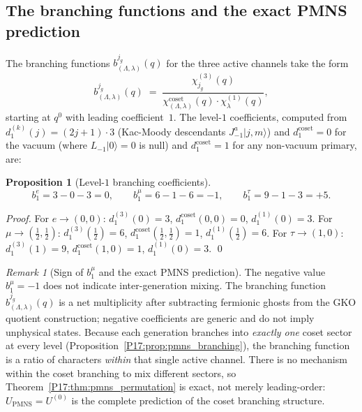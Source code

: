 \documentclass[11pt,a4paper]{article}
\newtheorem{proposition}[theorem]{Proposition}
\theoremstyle{definition}\newtheorem{definition}[theorem]{Definition}
\theoremstyle{remark}
\newtheorem{remark}[theorem]{Remark}
\begin{document}
\subsection{The branching functions and the exact PMNS prediction}

The branching functions $b^{j_g}_{(\Lambda,\lambda)}(q)$ for the three
active channels take the form
\[
  b^{j_g}_{(\Lambda,\lambda)}(q)
  \;=\;
  \frac{\chi_{j_g}^{(3)}(q)}
       {\chi^{\mathrm{coset}}_{(\Lambda,\lambda)}(q)\cdot\chi^{(1)}_\lambda(q)},
\]
starting at $q^0$ with leading coefficient~$1$.
The level-$1$ coefficients, computed from
$d_1^{(k)}(j)=(2j+1)\cdot3$ (Kac-Moody descendants $J^a_{-1}|j,m\rangle$)
and $d_1^{\mathrm{coset}}=0$ for the vacuum (where $L_{-1}|0\rangle=0$
is null) and $d_1^{\mathrm{coset}}=1$ for any non-vacuum primary, are:

\begin{proposition}[Level-$1$ branching coefficients]
\label{P17:prop:pmns_b1}
\begin{equation}
  b_1^e = 3-0-3 = 0,
  \qquad
  b_1^\mu = 6-1-6 = -1,
  \qquad
  b_1^\tau = 9-1-3 = +5.
  \label{P17:eq:b1_values}
\end{equation}
\end{proposition}

\begin{proof}
For $e\to(0,0)$: $d_1^{(3)}(0)=3$, $d_1^{\mathrm{coset}}(0,0)=0$, $d_1^{(1)}(0)=3$.
For $\mu\to(\tfrac12,\tfrac12)$: $d_1^{(3)}(\tfrac12)=6$,
$d_1^{\mathrm{coset}}(\tfrac12,\tfrac12)=1$, $d_1^{(1)}(\tfrac12)=6$.
For $\tau\to(1,0)$: $d_1^{(3)}(1)=9$, $d_1^{\mathrm{coset}}(1,0)=1$, $d_1^{(1)}(0)=3$.
\qed
\end{proof}

\begin{remark}[Sign of $b_1^\mu$ and the exact PMNS prediction]
\label{P17:rem:b1_sign}
The negative value $b_1^\mu=-1$ does not indicate inter-generation
mixing.  The branching function $b^{j_g}_{(\Lambda,\lambda)}(q)$ is
a net multiplicity after subtracting fermionic ghosts from the GKO
quotient construction; negative coefficients are generic and do not
imply unphysical states.  Because each generation branches into
\emph{exactly one} coset sector at every level
(Proposition~\ref{P17:prop:pmns_branching}), the branching function is a
ratio of characters \emph{within} that single active channel.  There
is no mechanism within the coset branching to mix different sectors,
so Theorem~\ref{P17:thm:pmns_permutation} is exact, not merely leading-order:
$U_{\mathrm{PMNS}}=U^{(0)}$ is the complete prediction of the coset
branching structure.
\end{remark}
\end{document}
